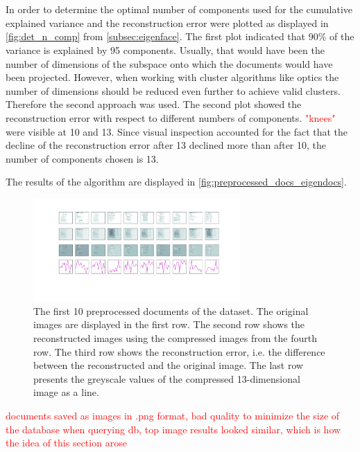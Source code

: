 \section{\eigendocs{}}\label{sec:evaluation-eigendocs}
In order to determine the optimal number of components used for \eigendocs{} the cumulative explained variance and the reconstruction error were plotted 
as displayed in \autoref{fig:det_n_comp} from \autoref{subsec:eigenface}.
The first plot indicated that 90\% of the variance is explained by 95 components.
Usually, that would have been the number of dimensions of the subspace onto which the documents would have been projected.
However, when working with cluster algorithms like \ac{optics} the number of dimensions should be reduced even further to achieve valid clusters.
Therefore the second approach was used.
The second plot showed the reconstruction error with respect to different numbers of components.
\textcolor{red}{"knees"} were visible at 10 and 13.
Since visual inspection accounted for the fact that the decline of the reconstruction error after 13 declined more than after 10, the number of components chosen is 13.

The results of the \eigendocs{} algorithm are displayed in \autoref{fig:preprocessed_docs_eigendocs}.

\begin{figure}[htp] %
    \centering
    \includegraphics[width=0.7\textwidth]{images/Eigendocs/transformation/eigendocs_13dims.pdf}
    \caption{The first 10 preprocessed documents of the dataset.
    The original images are displayed in the first row.
    The second row shows the reconstructed images using the compressed images from the fourth row.
    The third row shows the reconstruction error, i.e. the difference between the reconstructed and the original image.
    The last row presents the greyscale values of the compressed 13-dimensional image as a line.
    }
    \label{fig:preprocessed_docs_eigendocs}
\end{figure}


\textcolor{red}{documents saved as images in .png format, bad quality to minimize the size of the database
when querying db, top image results looked similar, which is how the idea of this section arose}